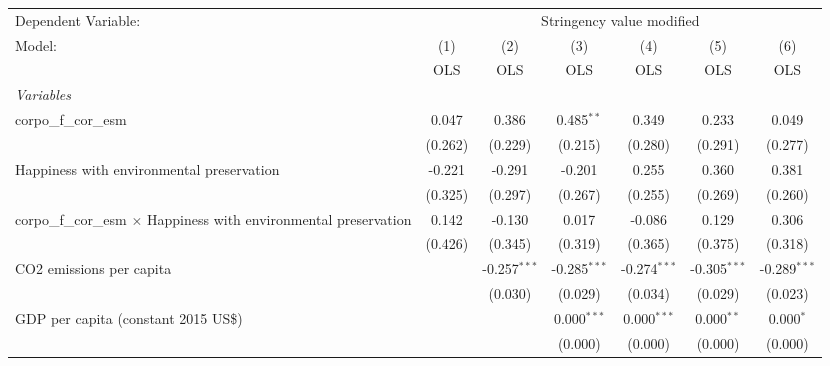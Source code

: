 
\begingroup
\centering
\begin{tabular}{lcccccc}
   \toprule
   Dependent Variable: & \multicolumn{6}{c}{Stringency value modified}\\
   Model:                                                                    & (1)     & (2)            & (3)            & (4)            & (5)            & (6)\\  
                                                                             &  OLS    & OLS            & OLS            & OLS            & OLS            & OLS\\  
   \midrule
   \emph{Variables}\\
   corpo\_f\_cor\_esm                                                        & 0.047   & 0.386          & 0.485$^{**}$   & 0.349          & 0.233          & 0.049\\   
                                                                             & (0.262) & (0.229)        & (0.215)        & (0.280)        & (0.291)        & (0.277)\\   
   Happiness with environmental preservation                                 & -0.221  & -0.291         & -0.201         & 0.255          & 0.360          & 0.381\\   
                                                                             & (0.325) & (0.297)        & (0.267)        & (0.255)        & (0.269)        & (0.260)\\   
   corpo\_f\_cor\_esm $\times$ Happiness with environmental preservation     & 0.142   & -0.130         & 0.017          & -0.086         & 0.129          & 0.306\\   
                                                                             & (0.426) & (0.345)        & (0.319)        & (0.365)        & (0.375)        & (0.318)\\   
   CO2 emissions per capita                                                  &         & -0.257$^{***}$ & -0.285$^{***}$ & -0.274$^{***}$ & -0.305$^{***}$ & -0.289$^{***}$\\   
                                                                             &         & (0.030)        & (0.029)        & (0.034)        & (0.029)        & (0.023)\\   
   GDP per capita (constant 2015 US\$)                                       &         &                & 0.000$^{***}$  & 0.000$^{***}$  & 0.000$^{**}$   & 0.000$^{*}$\\   
                                                                             &         &                & (0.000)        & (0.000)        & (0.000)        & (0.000)\\   

\end{tabular}
